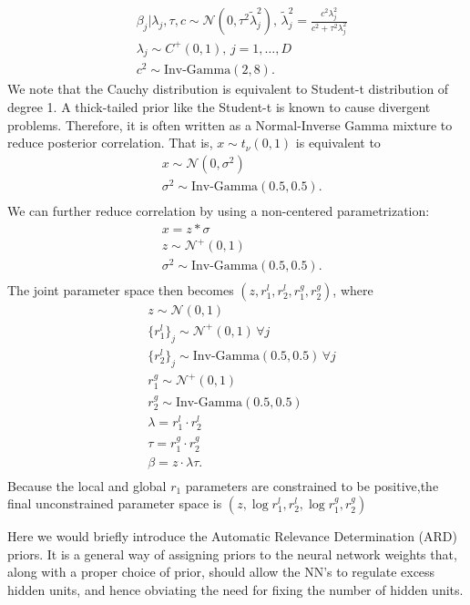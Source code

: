 \documentclass[12pt]{report}
\begin{document}
\begin{align*}
&\beta_j | \lambda_j, \tau, c \sim \mathcal{N}(0,\tau^2 \tilde{\lambda}_j^2) ,\, \tilde{\lambda}_j^2 = \frac{c^2 \lambda_j^2}{c^2 + \tau^2 \lambda_j^2} \\
&\lambda_j \sim C^+(0,1),\, j = 1,\dots,D\\
&c^2 \sim \text{Inv-Gamma}(2,8) .
\end{align*}
We note that the Cauchy distribution is equivalent to Student-t distribution of degree 1. A thick-tailed prior like the Student-t is known to cause divergent problems. Therefore, it is often written as a Normal-Inverse Gamma mixture to reduce posterior correlation. That is, $x \sim t_{\nu}(0,1) $ is 
equivalent to 
\begin{align*}
& x \sim \mathcal{N}(0,\sigma^2)\\
&\sigma^2 \sim \text{Inv-Gamma}(0.5,0.5). \\
\end{align*}
We can further reduce correlation by using a non-centered parametrization:
\begin{align*}
& x = z * \sigma \\
& z \sim \mathcal{N}^+(0,1)\\
&\sigma^2 \sim \text{Inv-Gamma}(0.5,0.5). \\
\end{align*}
The joint parameter space then becomes $(z,r_1^l,r_2^l,r_1^g,r_2^g) $,
where
\begin{align*}
& z \sim \mathcal{N}(0,1) \\
& \{r_1^l\}_j \sim \mathcal{N}^+(0,1) \, \forall j \\
& \{r_2^l\}_j \sim \text{Inv-Gamma}(0.5,0.5) \, \forall j  \\
& r_1^g \sim \mathcal{N}^+(0,1)  \\
& r_2^g \sim \text{Inv-Gamma}(0.5,0.5)   \\
& \lambda =  r_1^l \cdot r_2^l \\
& \tau = r_1^g \cdot r_2^g \\
& \beta = z \cdot \lambda \tau . \\
\end{align*}
Because the local and global $r_1$ parameters are constrained to be positive,the final unconstrained parameter space is $(z,\log r_1^l,r_2^l,\log r_1^g,r_2^g)$


Here we would briefly introduce the Automatic Relevance Determination (ARD) priors. It is a general way of assigning priors to the neural network weights that, along with a proper choice of prior, should allow the NN's to regulate excess hidden units, and hence obviating the need for fixing the number of hidden units.
\end{document}
